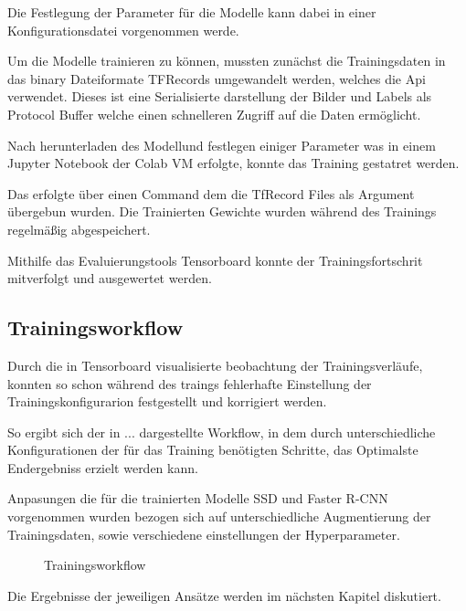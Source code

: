 Die Festlegung der Parameter für die Modelle kann dabei 
in einer Konfigurationsdatei vorgenommen werde.


Um die Modelle trainieren zu können, mussten zunächst die 
Trainingsdaten in das binary Dateiformate TFRecords umgewandelt 
werden, welches die Api verwendet. Dieses ist eine Serialisierte 
darstellung der Bilder und Labels als Protocol Buffer welche einen 
schnelleren Zugriff auf die Daten ermöglicht.

Nach herunterladen des Modellund festlegen einiger Parameter was in 
einem Jupyter Notebook der Colab VM erfolgte, konnte das Training 
gestatret werden. 

Das erfolgte über einen Command dem die TfRecord Files als Argument 
übergebun wurden. 
Die Trainierten Gewichte wurden während des Trainings regelmäßig abgespeichert.

Mithilfe das Evaluierungstools Tensorboard konnte der Trainingsfortschrit 
mitverfolgt und ausgewertet werden.


\subsection{Trainingsworkflow}

Durch die in Tensorboard visualisierte beobachtung der 
Trainingsverläufe, konnten so schon während des traings fehlerhafte 
Einstellung der Trainingskonfigurarion festgestellt und korrigiert 
werden.

So ergibt sich der in ... dargestellte Workflow, in dem 
durch unterschiedliche Konfigurationen der für das Training 
benötigten Schritte, das Optimalste Endergebniss erzielt 
werden kann.


Anpasungen die für die trainierten Modelle SSD und Faster 
R-CNN vorgenommen wurden bezogen sich auf unterschiedliche 
Augmentierung der Trainingsdaten, sowie verschiedene 
einstellungen der Hyperparameter.


%     

\vspace{1cm}
\begin{figure}[H]
    \centering
    
    \caption{Trainingsworkflow}
    \label{fig:train_workflow}
\end{figure}
\vspace{1cm}
Die Ergebnisse der jeweiligen Ansätze werden im nächsten Kapitel diskutiert.


